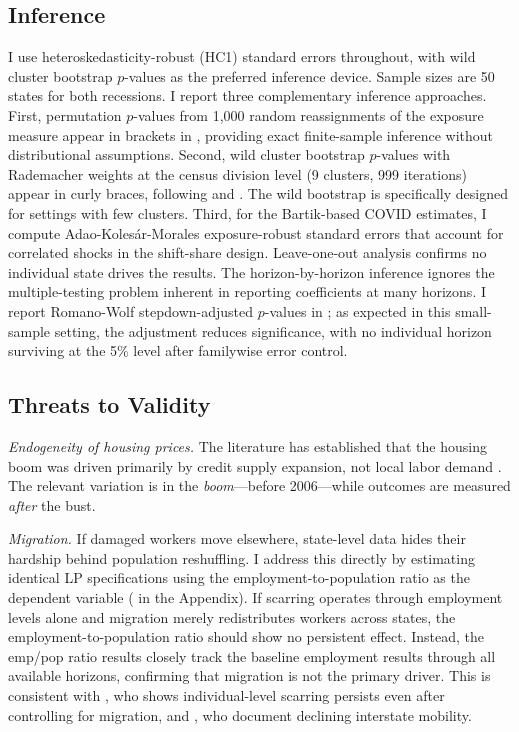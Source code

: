 \documentclass[12pt]{article}
\begin{document}
\subsection{Inference}

I use heteroskedasticity-robust (HC1) standard errors throughout, with wild cluster bootstrap $p$-values as the preferred inference device. Sample sizes are 50 states for both recessions. I report three complementary inference approaches. First, permutation $p$-values from 1,000 random reassignments of the exposure measure appear in brackets in , providing exact finite-sample inference without distributional assumptions. Second, wild cluster bootstrap $p$-values with Rademacher weights at the census division level (9 clusters, 999 iterations) appear in curly braces, following \citet{cameron2008bootstrap} and \citet{mackinnon2017wild}. The wild bootstrap is specifically designed for settings with few clusters. Third, for the Bartik-based COVID estimates, I compute Adao-Koles{\'a}r-Morales exposure-robust standard errors \citep{adao2019shift} that account for correlated shocks in the shift-share design. Leave-one-out analysis confirms no individual state drives the results. The horizon-by-horizon inference ignores the multiple-testing problem inherent in reporting coefficients at many horizons. I report Romano-Wolf stepdown-adjusted $p$-values \citep{romano2005stepwise} in ; as expected in this small-sample setting, the adjustment reduces significance, with no individual horizon surviving at the 5\% level after familywise error control.

\subsection{Threats to Validity}

\textit{Endogeneity of housing prices.} The literature has established that the housing boom was driven primarily by credit supply expansion, not local labor demand \citep{mian2013household}. The relevant variation is in the \textit{boom}---before 2006---while outcomes are measured \textit{after} the bust.

\textit{Migration.} If damaged workers move elsewhere, state-level data hides their hardship behind population reshuffling. I address this directly by estimating identical LP specifications using the employment-to-population ratio as the dependent variable ( in the Appendix). If scarring operates through employment levels alone and migration merely redistributes workers across states, the employment-to-population ratio should show no persistent effect. Instead, the emp/pop ratio results closely track the baseline employment results through all available horizons, confirming that migration is not the primary driver. This is consistent with \citet{yagan2019employment}, who shows individual-level scarring persists even after controlling for migration, and \citet{dao2017regional}, who document declining interstate mobility.
\end{document}
